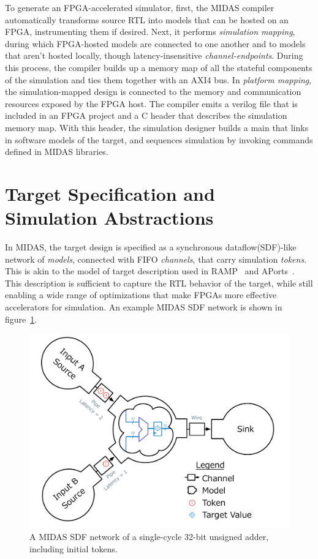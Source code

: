 To generate an FPGA-accelerated simulator, first, the MIDAS compiler
automatically transforms source RTL into models that can be hosted on an FPGA,
instrumenting them if desired. Next, it performs \emph{simulation mapping},
during which FPGA-hosted models are connected to one another and to models
that aren't hosted locally, though latency-insensitive \emph{channel-endpoints}.
During this process, the compiler builds up a memory map of all the stateful
components of the simulation and ties them together with an AXI4 bus. In
\emph{platform mapping}, the simulation-mapped design is connected to the
memory and communication resources exposed by the FPGA host. The compiler emits
a verilog file that is included in an FPGA project and a C header that
describes the simulation memory map.  With this header, the simulation
designer builds a main that links in software models of the target, and
sequences simulation by invoking commands defined in MIDAS libraries.

\section{Target Specification and Simulation Abstractions}\label{sec:sdf}

In MIDAS, the target design is specified as a synchronous dataflow(SDF)-like
network of \emph{models}, connected with FIFO \emph{channels}, that carry
simulation \emph{tokens}. This is akin to the model of target description used in
RAMP~\cite{ramp} and APorts~\cite{APortNetworks}. This description is sufficient
to capture the RTL behavior of the target, while still enabling a wide range of
optimizations that make FPGAs more effective accelerators for simulation. An
example MIDAS SDF network is shown in figure~\ref{fig:adder-example}.

\begin{figure}
	\centering
	\includegraphics[width=16cm]{figures/adder-example.pdf}
    \caption{A MIDAS SDF network of a single-cycle 32-bit unsigned adder, including initial tokens.}
	\label{fig:adder-example}
\end{figure}

